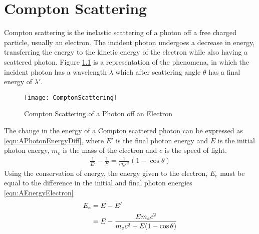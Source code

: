 \chapter{Compton Scattering}
\label{chap:ComptonScatter}

Compton scattering is the inelastic scattering of a photon off a free charged particle, usually an electron.
The incident photon undergoes a decrease in energy, transferring the energy to the kinetic energy of the electron while also having a scattered photon.
Figure \ref{fig:ComptonScattering} is a representation of the phenomena, in which the incident photon has a wavelength $\lambda$ which after scattering angle $\theta$ has a final energy of $\lambda'$.
\begin{figure}
  \centering
  \texttt{[image: ComptonScattering]}
  \caption{Compton Scattering of a Photon off an Electron}
  \label{fig:ComptonScattering}
\end{figure}
The change in the energy of a Compton scattered photon can be expressed as \eqref{eqn:APhotonEnergyDiff}, where $E'$ is the final photon energy and $E$ is the initial photon energy, $m_e$ is the mass of the electron and $c$ is the speed of light.
\begin{align}
  \label{eqn:AFinalPhotonEnergy}
  \frac{1}{E'} -\frac{1}{E} = \frac{1}{m_e c^2}\left(1-\cos\theta\right) 
\end{align}
Using the conservation of energy, the energy given to the electron, $E_e$ must be equal to the difference in the initial and final photon energies \eqref{eqn:AEnergyElectron}
\begin{align}
  \label{eqn:AEnergyElectron}
  E_e &= E - E' \\ \notag
   &= E - \frac{E m_e c^2}{m_e c^2 + E (1-\cos\theta)}
\end{align}

